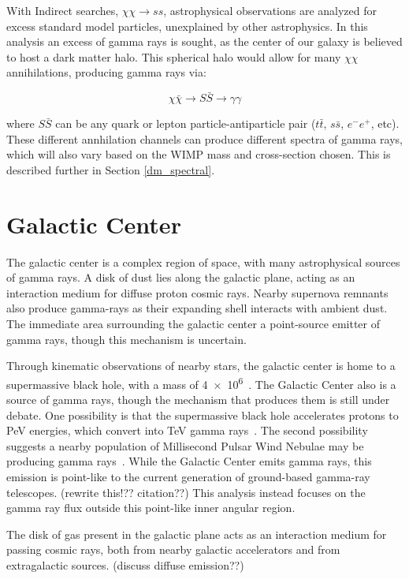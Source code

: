     With Indirect searches, $\chi\chi \rightarrow ss$, astrophysical observations are analyzed for excess standard model particles, unexplained by other astrophysics.
    In this analysis an excess of gamma rays is sought, as the center of our galaxy is believed to host a dark matter halo.
    This spherical halo would allow for many $\chi\chi$ annihilations, producing gamma rays via: 

    $$\chi\bar{\chi} \rightarrow S\bar{S} \rightarrow \gamma\gamma$$

    where $S\bar{S}$ can be any quark or lepton particle-antiparticle pair ($t\bar{t}$, $s\bar{s}$, $e^{-}e^{+}$, etc).
    These different annhilation channels can produce different spectra of gamma rays, which will also vary based on the WIMP mass and cross-section chosen.
    This is described further in Section \ref{dm_spectral}.

\FloatBarrier

\section{Galactic Center}

  The galactic center is a complex region of space, with many astrophysical sources of gamma rays.
  A disk of dust lies along the galactic plane, acting as an interaction medium for diffuse proton cosmic rays.
  Nearby supernova remnants also produce gamma-rays as their expanding shell interacts with ambient dust.
  The immediate area surrounding the galactic center a point-source emitter of gamma rays, though this mechanism is uncertain.

  Through kinematic observations of nearby stars, the galactic center is home to a supermassive black hole, with a mass of \SI{4e6}{\Msol}~\cite{sgra_massdist}.
  The Galactic Center also is a source of \TeV{} gamma rays, though the mechanism that produces them is still under debate.
  One possibility is that the supermassive black hole accelerates protons to PeV energies, which convert into TeV gamma rays~\cite{gc_pevatron}.
  The second possibility suggests a nearby population of Millisecond Pulsar Wind Nebulae may be producing gamma rays~\cite{gc_pulsars}.
  While the Galactic Center emits gamma rays, this emission is point-like to the current generation of ground-based gamma-ray telescopes. {\color{red}(rewrite this!?? citation??)}
  This analysis instead focuses on the gamma ray flux outside this point-like inner angular region.

  The disk of gas present in the galactic plane acts as an interaction medium for passing cosmic rays, both from nearby galactic accelerators and from extragalactic sources.
  {\color{red}(discuss diffuse emission??)}

